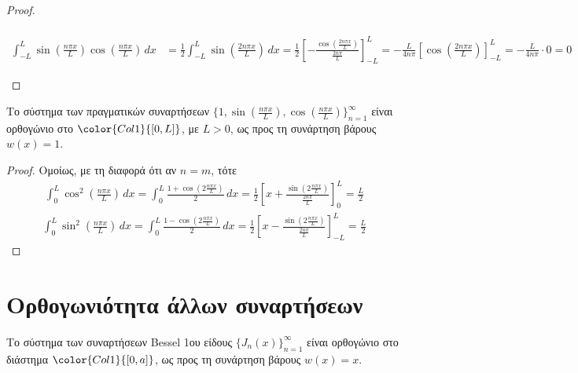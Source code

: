 \begin{proof}
\begin{myitemize}
\begin{align*}
      \end{align*}
      \begin{align*}
        \int _{-L}^{L} \sin{\left(\frac{n \pi x }{L}\right)} 
        \cos{\left(\frac{n \pi x}{L}\right)} \,{dx} 
            &= \frac{1}{2} \int _{-L}^{L} \sin{\left(\frac{2 n \pi x}{L}\right)} \,{dx} 
            = \frac{1}{2} \left[-\frac{\cos{\left(\frac{2 n \pi x}{L}\right)}}
            {\frac{2n \pi}{L}} \right]_{-L}^{L} 
            = -\frac{L}{4 n \pi} \left[\cos{\left(\frac{2n \pi x}{L}\right)} 
            \right]_{-L}^{L} = -\frac{L}{4n\pi}\cdot 0 = 0
      \end{align*}
  \end{myitemize}
\end{proof}
\begin{prop}
  Το σύστημα των πραγματικών συναρτήσεων 
  $ \{ 1, \sin{\left(\frac{n \pi x}{L}\right)}, 
  \cos{\left(\frac{n \pi x}{L}\right)} \}_{n=1}^{\infty} $ 
  είναι ορθογώνιο στο $ \color{Col1}{[0,L]} $, με $ L>0 $, ως προς τη συνάρτηση βάρους 
  $ w(x)=1 $.
\end{prop}
\begin{proof}
  Ομοίως, με τη διαφορά ότι αν $ n=m $, τότε 
  \begin{align*}
    \int _{0}^{L} \cos^{2}\left(\frac{n \pi x}{L}\right) \,{dx} = 
    \int _{0}^{L} \frac{1+ \cos{\left( 2 \frac{n \pi x}{L} \right)}}{2}
    \,{dx} = 
    \frac{1}{2} \left[x + \frac{\sin{\left(2 \frac{n \pi x}{L}\right)}}
    {\frac{2 n \pi}{L}} \right]_{0}^{L} = \frac{L}{2}
  \end{align*}
  \begin{align*}
    \int _{0}^{L} \sin^{2}\left(\frac{n \pi x}{L}\right) \,{dx} = 
    \int _{0}^{L} \frac{1- \cos{\left( 2 \frac{n \pi x}{L} \right)}}{2}
    \,{dx} = 
    \frac{1}{2} \left[x - \frac{\sin{\left(2 \frac{n \pi x}{L}\right)}}
    {\frac{2 n \pi}{L}} \right]_{-L}^{L} = \frac{L}{2}
  \end{align*}
\end{proof}

\section*{Ορθογωνιότητα άλλων συναρτήσεων}

\begin{prop}
  Το σύστημα των συναρτήσεων Bessel 1ου είδους $ \{ J_{n}(x) \} _{n=1}^{\infty} $ 
  είναι ορθογώνιο στο διάστημα $ \color{Col1}{[0,a]} $, ως προς τη συνάρτηση βάρους 
  $ w(x)=x $.
\end{prop}


